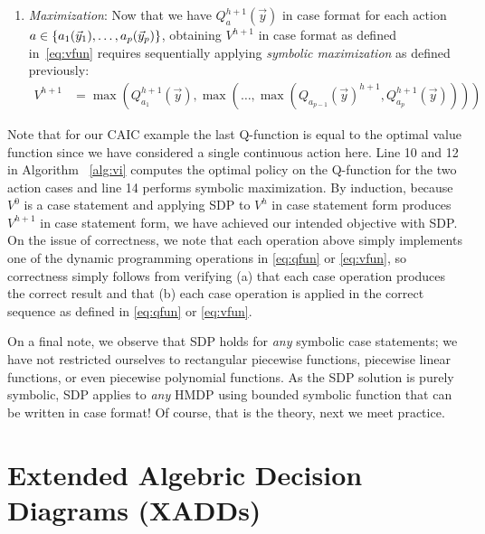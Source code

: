 \documentclass[twoside,11pt]{article}
\begin{document}
\begin{enumerate}
\item {\it Maximization}: Now that we have $Q_a^{h+1}(\vec{y})$ in
case format for each action $a \in\{a_{1}(\vec{y}_1), \ldots \\, a_{p}(\vec{y}_p)\}$, obtaining
$V^{h+1}$ in case format as defined in~\eqref{eq:vfun} requires
sequentially applying
\emph{symbolic maximization} as defined previously:
\begin{align*}
V^{h+1} & = 
\max(Q_{a_1}^{h+1}(\vec{y}),\max(\ldots,\max(Q_{a_{p-1}}(\vec{y})^{h+1},Q_{a_p}^{h+1}(\vec{y}))))
\end{align*}
\end{enumerate}
Note that for our \textsc{CAIC} example the last Q-function is equal to the optimal value function since we have considered a single continuous action here. Line 10 and 12 in Algorithm ~\ref{alg:vi} computes the optimal policy on the Q-function for the two action cases and line 14 performs symbolic maximization.
By induction, because $V^0$ is a case statement and applying
SDP to $V^h$ in case statement form produces $V^{h+1}$ in case
statement form, we have achieved our intended
objective with SDP.  On the issue of correctness,
we note that each operation above simply implements one of the
dynamic programming operations in \eqref{eq:qfun} or \eqref{eq:vfun}, 
so correctness simply follows from verifying (a) that each case
operation produces the correct result and that (b) each case operation
is applied in the correct sequence as defined in \eqref{eq:qfun} or 
\eqref{eq:vfun}.  

On a final note, we observe that SDP holds for \emph{any} symbolic
case statements; we have not restricted ourselves to rectangular
piecewise functions, piecewise linear functions, or even piecewise
polynomial functions.  As the SDP solution is purely symbolic,
SDP applies to \emph{any} HMDP using bounded symbolic function 
that can be written in case format!  Of course, that is the theory,
next we meet practice.

\section{Extended Algebric Decision Diagrams (XADDs)} \label{XADD}
\end{document}
